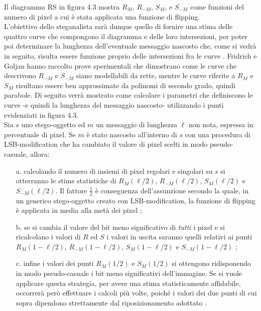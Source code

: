 Il diagramma RS in figura 4.3 mostra $R_{M}$, $R_{-M}$, $S_{M}$, e $S_{-M}$ come funzioni del numero di pixel a cui è stata applicata una funzione di flipping.\\L'obiettivo dello steganalista sarà dunque quello di fornire una stima delle quattro curve che compongono il diagramma e delle loro intersezioni, per poter poi determinare la lunghezza dell'eventuale messaggio nascosto che, come si vedrà in seguito, risulta essere funzione proprio delle intersezioni fra le curve \cite{fried1, fried2}. Fridrich e Goljan hanno raccolto prove sperimentali che dimostrano come le curve che descrivono $R_{-M}$ e $S_{-M}$ siano modellabili da rette, mentre le curve riferite a $R_{M}$ e $S_{M}$ risultano essere ben approssimate da polinomi di secondo grado, quindi parabole. Di seguito verrà mostrato come calcolare i parametri che definiscono le curve -e quindi la lunghezza del messaggio nascosto- utilizzando i punti evidenziati in figura 4.3.\\Sia $s$ uno stego-oggetto ed $m$ un messaggio di lunghezza $\ell$ non nota, espressa in percentuale di pixel. Se $m$ è stato nascosto all'interno di $s$ con una procedura di LSB-modification che ha cambiato il valore di pixel scelti in modo pseudo-casuale, allora:
\begin{itemize}
\item[a.]calcolando il numero di insiemi di pixel regolari e singolari su $s$ si otterranno le stime statistiche di $R_{M}(\ell /2)$, $R_{-M}(\ell /2)$, $S_{M}(\ell /2)$ e $S_{-M}(\ell /2)$. Il fattore $\frac{1}{2}$ è conseguenza dell'assunzione secondo la quale, in un generico stego-oggetto creato con LSB-modification, la funzione di flipping è applicata in media alla metà dei pixel \cite{fried1, seeingTheUnseen, warfare};
\item[b.]se si cambia il valore del bit meno significativo di \textit{tutti} i pixel e si ricalcolano i valori di $R$ ed $S$ i valori in uscita saranno quelli relativi ai punti $R_{M}(1-\ell /2)$, $R_{-M}(1-\ell /2)$, $S_{M}(1-\ell /2)$ e $S_{-M}(1- \ell /2)$ \cite{fried1, fried2};
\item[c.]infine i valori dei punti $R_{M}(1/2)$ e $S_{M}(1/2)$ si ottengono ridisponendo in modo pseudo-casuale i bit meno significativi dell'immagine. Se si vuole applicare questa strategia, per avere una stima statisticamente affidabile, occorrerà però effettuare i calcoli più volte, poiché i valori dei due punti di cui sopra dipendono strettamente dal riposizionamento adottato \cite{fried1}.
\end{itemize}
